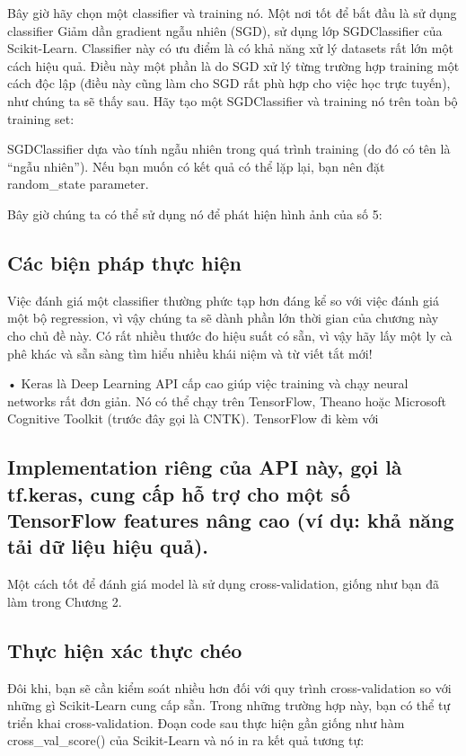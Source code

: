 Bây giờ hãy chọn một classifier và training nó. Một nơi tốt để bắt đầu là sử dụng classifier Giảm dần gradient ngẫu nhiên (SGD), sử dụng lớp SGDClassifier của Scikit-Learn. Classifier này có ưu điểm là có khả năng xử lý datasets rất lớn một cách hiệu quả. Điều này một phần là do SGD xử lý từng trường hợp training một cách độc lập (điều này cũng làm cho SGD rất phù hợp cho việc học trực tuyến), như chúng ta sẽ thấy sau. Hãy tạo một SGDClassifier và training nó trên toàn bộ training set:

SGDClassifier dựa vào tính ngẫu nhiên trong quá trình training (do đó có tên là “ngẫu nhiên”). Nếu bạn muốn có kết quả có thể lặp lại, bạn nên đặt random\_state parameter.

Bây giờ chúng ta có thể sử dụng nó để phát hiện hình ảnh của số 5:

\subsection{Các biện pháp thực hiện}

Việc đánh giá một classifier thường phức tạp hơn đáng kể so với việc đánh giá một bộ regression, vì vậy chúng ta sẽ dành phần lớn thời gian của chương này cho chủ đề này. Có rất nhiều thước đo hiệu suất có sẵn, vì vậy hãy lấy một ly cà phê khác và sẵn sàng tìm hiểu nhiều khái niệm và từ viết tắt mới!

• Keras là Deep Learning API cấp cao giúp việc training và chạy neural networks rất đơn giản. Nó có thể chạy trên TensorFlow, Theano hoặc Microsoft Cognitive Toolkit (trước đây gọi là CNTK). TensorFlow đi kèm với

\subsection{Implementation riêng của API này, gọi là tf.keras, cung cấp hỗ trợ cho một số TensorFlow features nâng cao (ví dụ: khả năng tải dữ liệu hiệu quả).}

Một cách tốt để đánh giá model là sử dụng cross-validation, giống như bạn đã làm trong Chương 2.

\subsection{Thực hiện xác thực chéo}

Đôi khi, bạn sẽ cần kiểm soát nhiều hơn đối với quy trình cross-validation so với những gì Scikit-Learn cung cấp sẵn. Trong những trường hợp này, bạn có thể tự triển khai cross-validation. Đoạn code sau thực hiện gần giống như hàm cross\_val\_score() của Scikit-Learn và nó in ra kết quả tương tự:

